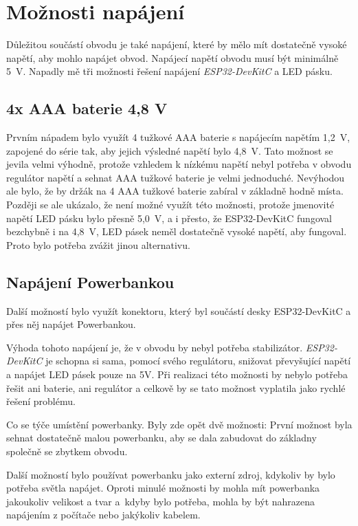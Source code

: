 \section{Možnosti napájení}

Důležitou součástí obvodu je také napájení, které by mělo mít dostatečně vysoké napětí, aby mohlo napájet obvod. Napájecí napětí obvodu musí být minimálně 5~V. Napadly mě tři možnosti řešení napájení \textit{ESP32-DevKitC} a LED pásku.


\subsection{4x AAA baterie 4,8 V}

Prvním nápadem bylo využít 4 tužkové AAA baterie s napájecím napětím 1,2~V, zapojené do série tak, aby jejich výsledné napětí bylo 4,8~V. Tato možnost se jevila velmi výhodně, protože vzhledem k nízkému napětí nebyl potřeba v obvodu regulátor napětí a sehnat AAA tužkové baterie je velmi jednoduché. Nevýhodou ale bylo, že by držák na 4 AAA tužkové baterie zabíral v základně hodně místa.
\newpage
Později se ale ukázalo, že není možné využít této možnosti, protože jmenovité napětí LED pásku bylo přesně 5,0~V, a i přesto, že ESP32-DevKitC fungoval bezchybně i na 4,8~V, LED pásek neměl dostatečně vysoké napětí, aby fungoval. Proto bylo potřeba zvážit jinou alternativu.


\subsection{Napájení Powerbankou}

Další možností bylo využít konektoru, který byl součástí desky  ESP32-DevKitC a přes něj napájet Powerbankou.

Výhoda tohoto napájení je, že v obvodu by nebyl potřeba stabilizátor. \textit{ESP32-DevKitC} je schopna si sama, pomocí svého regulátoru, snižovat převyšující napětí a napájet LED pásek pouze na 5V. Při realizaci této možnosti by nebylo potřeba řešit ani baterie, ani regulátor a celkově by se tato možnost vyplatila jako rychlé řešení problému. 

Co se týče umístění powerbanky. Byly zde opět dvě možnosti: %
První možnost byla sehnat dostatečně malou powerbanku, aby se dala zabudovat do základny společně se zbytkem obvodu. 

Další možností bylo používat powerbanku jako externí zdroj, kdykoliv by bylo potřeba světla napájet. Oproti minulé možnosti by mohla mít powerbanka jakoukoliv velikost a tvar a~kdyby bylo potřeba, mohla by být nahrazena napájením z počítače nebo jakýkoliv kabelem.  

